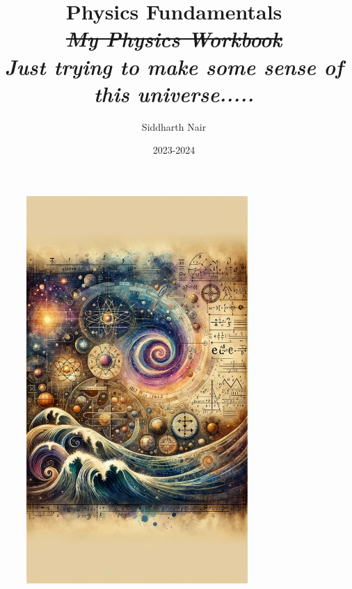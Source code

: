 \documentclass[11pt, letterpaper, openany]{book}
\title{Physics Fundamentals\\[1ex]{\small \textit{\sout{ My Physics Workbook}}}\\ {\tiny \textit{Just trying to make some sense of this universe.....}}}
\author{Siddharth Nair}
\date{2023-2024}
\begin{document}
\frontmatter
\maketitle

\begin{figure}[htbp]
  \centering
  \includegraphics[width=0.75\textwidth]{titleCover.png}
\end{figure}
\FloatBarrier

\tableofcontents
\end{document}
